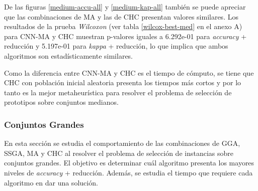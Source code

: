 De las figuras \ref{medium-accu-all} y \ref{medium-kap-all} también se puede apreciar que las combinaciones de MA y las de CHC presentan valores similares. Los resultados de la prueba \emph{Wilcoxon} (ver tabla \ref{wilcox-best-med} en el anexo A) para CNN-MA y CHC muestran p-valores iguales a 6.292e-01 para \emph{accuracy} + reducción y 5.197e-01 para \emph{kappa} + reducción, lo que implica que ambos algoritmos son estadísticamente similares.

Como la diferencia entre CNN-MA y CHC es el tiempo de cómputo, se tiene que CHC con población inicial aleatoria presenta los tiempos más cortos y por lo tanto es la mejor metaheurística para resolver el problema de selección de prototipos sobre conjuntos medianos.


\subsubsection{Conjuntos Grandes}

En esta sección se estudia el comportamiento de las combinaciones de GGA, SSGA, MA y CHC al resolver el problema de selección de instancias sobre conjuntos grandes. El objetivo es determinar cuál algoritmo presenta los mayores niveles de \emph{accuracy} + reducción. Además, se estudia el tiempo que requiere cada algoritmo en dar una solución.

